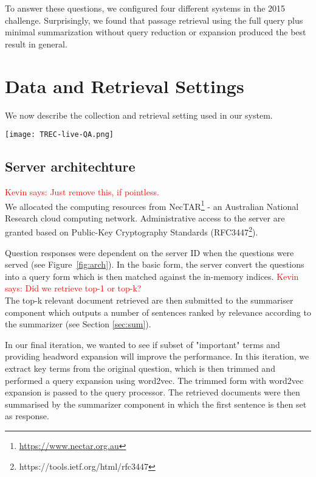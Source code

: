 \documentclass[a4paper,10pt,conference,compsocconf,final]{IEEEtran}
\newcommand{\ko}[1]{\textrm{\textcolor{red}{Kevin says: #1\\}}}
\begin{document}
\bigskip

To answer these questions, we configured four different systems 
in the 2015 challenge.
Surprisingly, we found that passage retrieval using the full query
plus minimal summarization without query reduction or expansion
produced the best result in general.

\section{Data and Retrieval Settings}
We now describe the collection and retrieval setting used in our
system. 

\begin{figure*}
  \centering
  \texttt{[image: TREC-live-QA.png]}
  \label{fig:arch}
  \caption{System architechture for each RMIT system. Green shading indicates components that are different when compared to RMIT-0.}
\end{figure*}

\subsection{Server architechture}
\ko{Just remove this, if pointless.}
We allocated the computing resources from NecTAR\footnote{\url{https://www.nectar.org.au}} - an Australian National Research cloud computing network. Administrative access to the server are granted based on Public-Key Cryptography Standards (RFC3447\footnote{https://tools.ietf.org/html/rfc3447}). 

Question responses were dependent on the server ID when the questions were served (see Figure~\ref{fig:arch}). In the basic form, the server convert the questions into a query form which is then matched against the in-memory indices. 
\ko{Did we retrieve top-1 or top-k?}
The top-k relevant document retrieved are then submitted to the summariser component which outputs a number of sentences ranked by relevance according to the summarizer (see Section \ref{sec:sum}). 

In our final iteration, we wanted to see if subset of "important" terms and providing headword expansion will improve the performance. In this iteration, we extract key terms from the original question, which is then trimmed and performed a query expansion using word2vec. The trimmed form with word2vec expansion is passed to the query processor. The retrieved documents were then summarised by the summarizer component in which the first sentence is then set as response.
\end{document}
